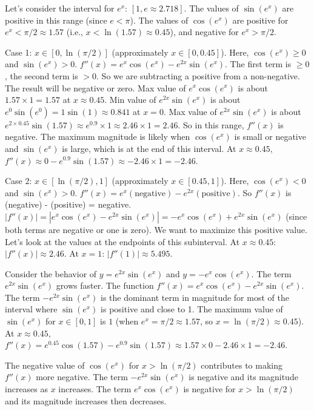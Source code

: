 \documentclass{article}
\begin{document}
Let's consider the interval for $e^x$: $[1, e \approx 2.718]$.
The values of $\sin(e^x)$ are positive in this range (since $e < \pi$).
The values of $\cos(e^x)$ are positive for $e^x < \pi/2 \approx 1.57$ (i.e., $x < \ln(1.57) \approx 0.45$), and negative for $e^x > \pi/2$.

Case 1: $x \in [0, \ln(\pi/2)]$ (approximately $x \in [0, 0.45]$).
Here, $\cos(e^x) \ge 0$ and $\sin(e^x) > 0$.
$f''(x) = e^x \cos(e^x) - e^{2x} \sin(e^x)$.
The first term is $\ge 0$, the second term is $>0$. So we are subtracting a positive from a non-negative. The result will be negative or zero.
Max value of $e^x \cos(e^x)$ is about $1.57 \times 1 = 1.57$ at $x \approx 0.45$.
Min value of $e^{2x} \sin(e^x)$ is about $e^0 \sin(e^0) = 1 \sin(1) \approx 0.841$ at $x=0$.
Max value of $e^{2x} \sin(e^x)$ is about $e^{2 \times 0.45} \sin(1.57) \approx e^{0.9} \times 1 \approx 2.46 \times 1 = 2.46$.
So in this range, $f''(x)$ is negative. The maximum magnitude is likely when $\cos(e^x)$ is small or negative and $\sin(e^x)$ is large, which is at the end of this interval.
At $x \approx 0.45$, $f''(x) \approx 0 - e^{0.9} \sin(1.57) \approx -2.46 \times 1 = -2.46$.

Case 2: $x \in [\ln(\pi/2), 1]$ (approximately $x \in [0.45, 1]$).
Here, $\cos(e^x) < 0$ and $\sin(e^x) > 0$.
$f''(x) = e^x (\text{negative}) - e^{2x} (\text{positive})$.
So $f''(x)$ is (negative) - (positive) = negative.
$|f''(x)| = |e^x \cos(e^x) - e^{2x} \sin(e^x)| = -e^x \cos(e^x) + e^{2x} \sin(e^x)$ (since both terms are negative or one is zero).
We want to maximize this positive value.
Let's look at the values at the endpoints of this subinterval.
At $x \approx 0.45$: $|f''(x)| \approx 2.46$.
At $x = 1$: $|f''(1)| \approx 5.495$.

Consider the behavior of $y = e^{2x} \sin(e^x)$ and $y = -e^x \cos(e^x)$.
The term $e^{2x} \sin(e^x)$ grows faster.
The function $f''(x) = e^x \cos(e^x) - e^{2x} \sin(e^x)$.
The term $-e^{2x} \sin(e^x)$ is the dominant term in magnitude for most of the interval where $\sin(e^x)$ is positive and close to 1.
The maximum value of $\sin(e^x)$ for $x \in [0,1]$ is $1$ (when $e^x = \pi/2 \approx 1.57$, so $x = \ln(\pi/2) \approx 0.45$).
At $x \approx 0.45$, $f''(x) = e^{0.45} \cos(1.57) - e^{0.9} \sin(1.57) \approx 1.57 \times 0 - 2.46 \times 1 = -2.46$.

The negative value of $\cos(e^x)$ for $x > \ln(\pi/2)$ contributes to making $f''(x)$ more negative.
The term $-e^{2x} \sin(e^x)$ is negative and its magnitude increases as $x$ increases.
The term $e^x \cos(e^x)$ is negative for $x > \ln(\pi/2)$ and its magnitude increases then decreases.
\end{document}
